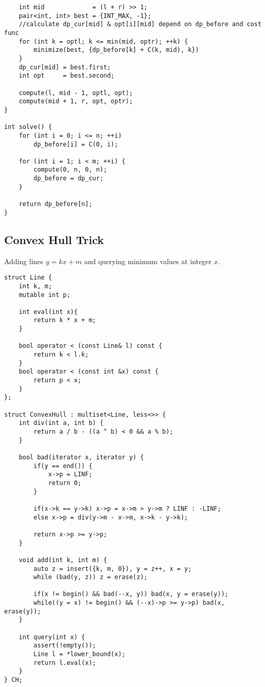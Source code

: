 \documentclass[11pt,a4paper]{article}
\begin{document}
\begin{multicols*}{2}
\begin{lstlisting}
    int mid             = (l + r) >> 1;
    pair<int, int> best = {INT_MAX, -1};
    //calculate dp_cur[mid] & opt[i][mid] depend on dp_before and cost func
    for (int k = optl; k <= min(mid, optr); ++k) {
        minimize(best, {dp_before[k] + C(k, mid), k})
    }
    dp_cur[mid] = best.first;
    int opt     = best.second;

    compute(l, mid - 1, optl, opt);
    compute(mid + 1, r, opt, optr);
}

int solve() {
    for (int i = 0; i <= n; ++i)
        dp_before[i] = C(0, i);

    for (int i = 1; i < m; ++i) {
        compute(0, n, 0, n);
        dp_before = dp_cur;
    }

    return dp_before[n];
}
\end{lstlisting}

\subsection{Convex Hull Trick}
Adding lines $y = kx + m$ and querying minimum values at integer $x$.
\begin{lstlisting}
struct Line {
    int k, m;
    mutable int p;
    
    int eval(int x){
    	return k * x + m;
    }
    
    bool operator < (const Line& l) const {
        return k < l.k;
    }
    bool operator < (const int &x) const {
        return p < x;
    }
};
 
struct ConvexHull : multiset<Line, less<>> {
    int div(int a, int b) {
        return a / b - ((a ^ b) < 0 && a % b);
    }

    bool bad(iterator x, iterator y) {
        if(y == end()) { 
            x->p = LINF;
            return 0; 
        }

        if(x->k == y->k) x->p = x->m > y->m ? LINF : -LINF;
        else x->p = div(y->m - x->m, x->k - y->k);

        return x->p >= y->p;
    }

    void add(int k, int m) {
        auto z = insert({k, m, 0}), y = z++, x = y;
        while (bad(y, z)) z = erase(z);

        if(x != begin() && bad(--x, y)) bad(x, y = erase(y));
        while((y = x) != begin() && (--x)->p >= y->p) bad(x, erase(y));
    }

    int query(int x) {
        assert(!empty());
        Line l = *lower_bound(x);
        return l.eval(x);
    }
} CH;


\end{lstlisting}
\end{multicols*}
\end{document}

